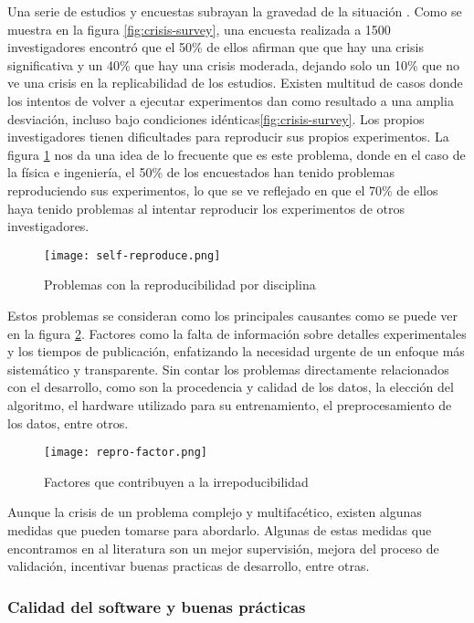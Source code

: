 Una serie de estudios y encuestas subrayan la gravedad de la situación \cite{Baker_2016}.
Como se muestra en la figura \ref{fig:crisis-survey}, una encuesta realizada a 1500 investigadores
encontró que el 50\% de ellos afirman que que hay una crisis significativa y un 40\% que hay
una crisis moderada, dejando solo un 10\% que no ve una crisis en la replicabilidad de los estudios.
Existen multitud de casos donde los intentos de volver a ejecutar experimentos dan como resultado 
a una amplia desviación, incluso bajo condiciones idénticas\ref{fig:crisis-survey}.
Los propios investigadores tienen dificultades para reproducir sus propios experimentos.
La figura \ref{fig:self-reproduce} nos da una idea de lo frecuente que es este problema,
donde en el caso de la física e ingeniería, el 50\% de los encuestados han tenido problemas
reproduciendo sus experimentos, lo que se ve reflejado en que el 70\% de ellos haya tenido
problemas al intentar reproducir los experimentos de otros investigadores.

\begin{figure}[ht]
    \centering
    \texttt{[image: self-reproduce.png]}
    \caption{Problemas con la reproducibilidad por disciplina \cite{Baker_2016}}\label{fig:self-reproduce}
\end{figure}

Estos problemas se consideran como los principales causantes como se puede ver en la figura \ref{fig:repro-factor}.
Factores como la falta de información sobre detalles experimentales y los tiempos de publicación, enfatizando 
la necesidad urgente de un enfoque más sistemático y transparente. Sin contar los problemas
directamente relacionados con el desarrollo, como son la procedencia y calidad de los datos, la 
elección del algoritmo, el hardware utilizado para su entrenamiento, el preprocesamiento de 
los datos, entre otros.

\begin{figure}[ht]
    \centering
    \texttt{[image: repro-factor.png]}
    \caption{Factores que contribuyen a la irrepoducibilidad \cite{Baker_2016}}\label{fig:repro-factor}
\end{figure}

Aunque la crisis de un problema complejo y multifacético, existen
algunas medidas que pueden tomarse para abordarlo. Algunas de estas medidas que encontramos
en al literatura son un mejor supervisión, mejora del proceso de validación, incentivar
buenas practicas de desarrollo, entre otras. 

\subsubsection{Calidad del software y buenas prácticas}


\pagebreak